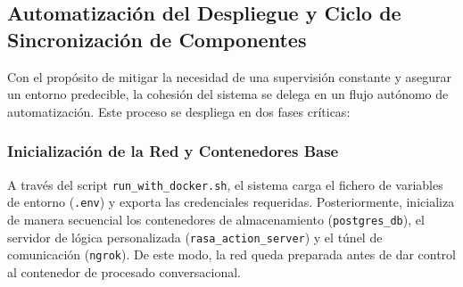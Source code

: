 \documentclass[a4paper,12pt,twoside,final]{book}
\begin{document}
\subsection{Automatización del Despliegue y Ciclo de Sincronización de Componentes}
Con el propósito de mitigar la necesidad de una supervisión constante y asegurar un entorno predecible, la cohesión del sistema se delega en un flujo autónomo de automatización. Este proceso se despliega en dos fases críticas:

\subsubsection{Inicialización de la Red y Contenedores Base}
A través del script \texttt{run\_with\_docker.sh}, el sistema carga el fichero de variables de entorno (\texttt{.env}) y exporta las credenciales requeridas. Posteriormente, inicializa de manera secuencial los contenedores de almacenamiento (\texttt{postgres\_db}), el servidor de lógica personalizada (\texttt{rasa\_action\_server}) y el túnel de comunicación (\texttt{ngrok}). De este modo, la red queda preparada antes de dar control al contenedor de procesado conversacional.
\end{document}
